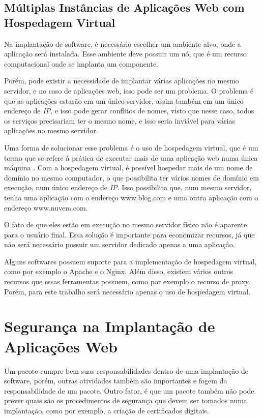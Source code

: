 \subsection{Múltiplas Instâncias de Aplicações Web com Hospedagem Virtual}
\label{sub:multiplas}
Na implantação de software, é necessário escolher um ambiente alvo, onde a aplicação
será instalada. Esse ambiente deve possuir um nó, que é um recurso computacional
onde se implanta um componente. 

Porém, pode existir a necessidade de implantar várias aplicações no mesmo servidor, e no caso
de aplicações web, isso pode ser um problema. O problema é que as aplicações estarão em um
único servidor, assim também em um único endereço de \textit{IP}, e isso pode gerar
conflitos de nomes, visto que nesse caso, todos os serviços precisariam ter o mesmo
nome, e isso seria inviável para várias aplicações no mesmo servidor.

Uma forma de solucionar esse problema é o uso de hospedagem virtual, que é um 
termo que se refere à prática de executar mais de uma aplicação web numa única 
máquina \cite{apachvh}. Com a hospedagem virtual, é possível
hospedar mais de um nome de domínio no mesmo computador, o que possibilita ter
vários nomes de domínio em execução, num único endereço de \textit{IP}. Isso
possibilita que, num mesmo servidor, tenha uma aplicação com o endereço
 www.blog.com e uma outra aplicação com o endereço www.nuvem.com. 

O fato de que eles estão em execução no mesmo servidor físico não é aparente 
para o usuário final. Essa solução é importante para economizar recursos, 
já que não será necessário possuir um servidor dedicado apenas a uma aplicação.

Alguns softwares possuem suporte para a implementação de hospedagem virtual, como por
exemplo o Apache e o Nginx. Além disso, existem vários
outros recursos que essas ferramentas possuem, como por exemplo o recurso de proxy.
Porém, para este trabalho será necessário apenas o uso de hospedagem virtual.

\section{Segurança na Implantação de Aplicações Web}
\label{sec:seguranca}

Um pacote cumpre bem suas responsabilidades dentro de uma implantação de
software, porém, outras atividades também são importantes e fogem da responsabilidade 
de um pacote. Outro fator, é que um pacote também não pode prever quais são
os procedimentos de segurança que devem ser tomados numa implantação, como por 
exemplo, a criação de certificados digitais. 

